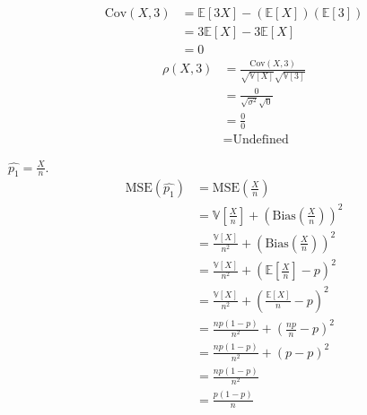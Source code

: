 \documentclass[12pt]{article}
\begin{document}
\newpage
{}
\begin{align*}
    \text{Cov}(X,3) &= \mathbb E[3X] -(\mathbb E[X])(\mathbb E[3]) \\
                    &= 3\mathbb E[X] - 3\mathbb E[X] \\
                    &= 0
\end{align*}
\begin{align*}
    \rho(X,3) &= \frac{\text{Cov}(X,3)}{\sqrt{\mathbb V[X]}\sqrt{\mathbb V[3]}} \\
              &= \frac{0}{\sqrt{\sigma^2}\sqrt{0}} \\
              &= \frac00 \\
              &= \text{Undefined}
\end{align*}

\newpage
{}

\medskip
{} $\hat{p_1} = \frac Xn$.
\begin{align*}
    \text{MSE}(\hat{p_1}) &= \text{MSE}\left(\frac Xn\right) \\
                          &= \mathbb V\left[\frac Xn\right] + \left(\text{Bias}\left(\frac Xn\right)\right)^2 \\
                          &= \frac{\mathbb V[X]}{n^2} + \left(\text{Bias}\left(\frac Xn\right)\right)^2 \\
                          &= \frac{\mathbb V[X]}{n^2} + \left( \mathbb E\left[\frac Xn\right] - p \right)^2 \\
                          &= \frac{\mathbb V[X]}{n^2} + \left( \frac{\mathbb E[X]}{n} - p \right)^2 \\
                          &= \frac{np(1-p)}{n^2} + \left( \frac{np}{n} - p \right)^2 \\
                          &= \frac{np(1-p)}{n^2} + \left( p - p \right)^2 \\
                          &= \frac{np(1-p)}{n^2} \\
                          &= \frac{p(1-p)}{n}
\end{align*}
\end{document}
